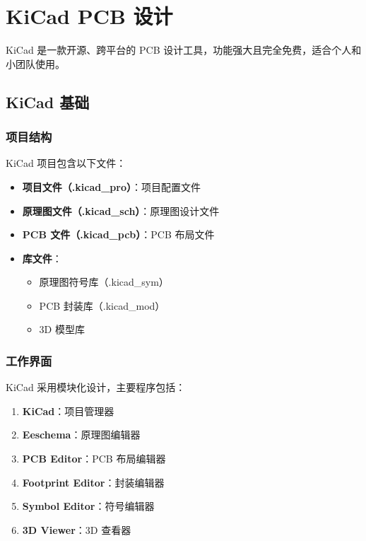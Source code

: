 \section{KiCad PCB 设计}

KiCad 是一款开源、跨平台的 PCB 设计工具，功能强大且完全免费，适合个人和小团队使用。

\subsection{KiCad 基础}

\subsubsection{项目结构}

KiCad 项目包含以下文件：

\begin{itemize}
  \item \textbf{项目文件（.kicad\_pro）}：项目配置文件
  \item \textbf{原理图文件（.kicad\_sch）}：原理图设计文件
  \item \textbf{PCB 文件（.kicad\_pcb）}：PCB 布局文件
  \item \textbf{库文件}：
    \begin{itemize}
      \item 原理图符号库（.kicad\_sym）
      \item PCB 封装库（.kicad\_mod）
      \item 3D 模型库
    \end{itemize}
\end{itemize}

\subsubsection{工作界面}

KiCad 采用模块化设计，主要程序包括：

\begin{enumerate}
  \item \textbf{KiCad}：项目管理器
  \item \textbf{Eeschema}：原理图编辑器
  \item \textbf{PCB Editor}：PCB 布局编辑器
  \item \textbf{Footprint Editor}：封装编辑器
  \item \textbf{Symbol Editor}：符号编辑器
  \item \textbf{3D Viewer}：3D 查看器
\end{enumerate}

